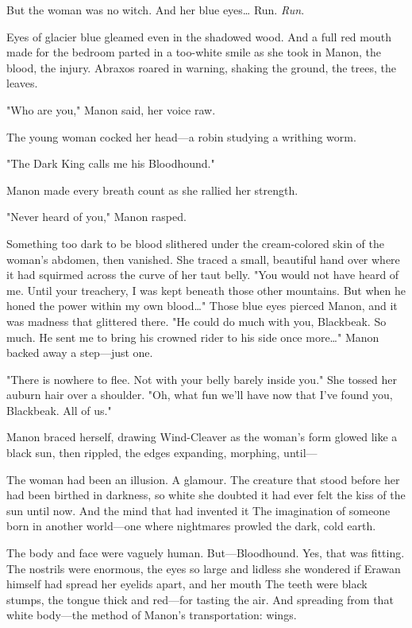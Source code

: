 But the woman was no witch. And her blue eyes\ldots{} Run. \emph{Run}.

Eyes of glacier blue gleamed even in the shadowed wood. And a full red mouth made for the bedroom parted in a too-white smile as she took in Manon, the blood, the injury. Abraxos roared in warning, shaking the ground, the trees, the leaves.

"Who are you," Manon said, her voice raw.

The young woman cocked her head---a robin studying a writhing worm.

"The Dark King calls me his Bloodhound."

Manon made every breath count as she rallied her strength.

"Never heard of you," Manon rasped.

Something too dark to be blood slithered under the cream-colored skin of the woman's abdomen, then vanished. She traced a small, beautiful hand over where it had squirmed across the curve of her taut belly. "You would not have heard of me. Until your treachery, I was kept beneath those other mountains. But when he honed the power within my own blood\ldots" Those blue eyes pierced Manon, and it was madness that glittered there. "He could do much with you, Blackbeak. So much. He sent me to bring his crowned rider to his side once more\ldots" Manon backed away a step---just one.

"There is nowhere to flee. Not with your belly barely inside you." She tossed her auburn hair over a shoulder. "Oh, what fun we'll have now that I've found you, Blackbeak. All of us."

Manon braced herself, drawing Wind-Cleaver as the woman's form glowed like a black sun, then rippled, the edges expanding, morphing, until---

The woman had been an illusion. A glamour. The creature that stood before her had been birthed in darkness, so white she doubted it had ever felt the kiss of the sun until now. And the mind that had invented it  The imagination of someone born in another world---one where nightmares prowled the dark, cold earth.

The body and face were vaguely human. But---Bloodhound. Yes, that was fitting. The nostrils were enormous, the eyes so large and lidless she wondered if Erawan himself had spread her eyelids apart, and her mouth
 The teeth were black stumps, the tongue thick and red---for tasting the air. And spreading from that white body---the method of Manon's transportation: wings.

